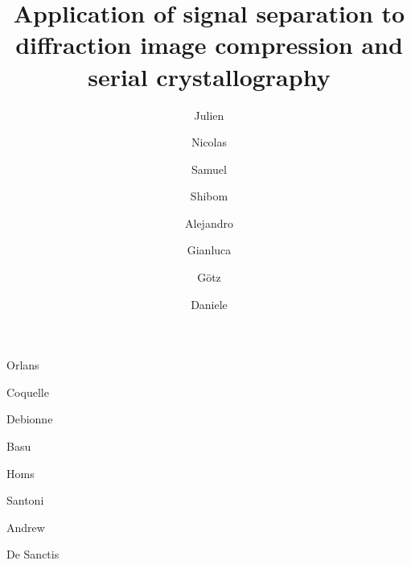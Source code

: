 \documentclass[preprint]{iucr}              %
\begin{document}



\title{Application of signal separation to diffraction image compression and serial crystallography}


\author[a]{Julien}{Orlans}
\author[a]{Nicolas}{Coquelle}
\author[a]{Samuel}{Debionne}
\author[b]{Shibom}{Basu}
\author[a]{Alejandro}{Homs}
\author[a]{Gianluca}{Santoni}
\author[a]{Götz}{Andrew}
\author[a]{Daniele}{De Sanctis}








\end{document}
